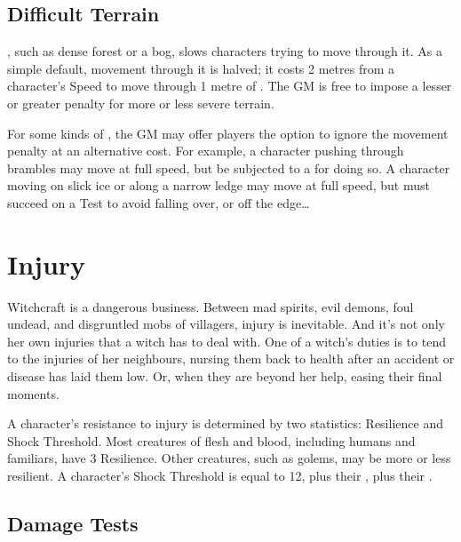 

\subsection{Difficult Terrain}

, such as dense forest or a bog, slows characters trying to move through it.
As a simple default, movement through it is halved; it costs 2 metres from a character's Speed to move through 1 metre of .
The GM is free to impose a lesser or greater penalty for more or less severe terrain.

For some kinds of , the GM may offer players the option to ignore the movement penalty at an alternative cost.
For example, a character pushing through brambles may move at full speed, but be subjected to a  for doing so.
A character moving on slick ice or along a narrow ledge may move at full speed, but must succeed on a  Test to avoid falling over, or off the edge\dots

\section{Injury}

Witchcraft is a dangerous business.
Between mad spirits, evil demons, foul undead, and disgruntled mobs of villagers, injury is inevitable.
And it's not only her own injuries that a witch has to deal with.
One of a witch's duties is to tend to the injuries of her neighbours, nursing them back to health after an accident or disease has laid them low.
Or, when they are beyond her help, easing their final moments.

A character's resistance to injury is determined by two statistics: Resilience and Shock Threshold.
Most creatures of flesh and blood, including humans and familiars, have $3$ Resilience.
Other creatures, such as golems, may be more or less resilient.
A character's Shock Threshold is equal to 12, plus their , plus their .

\subsection{Damage Tests}

